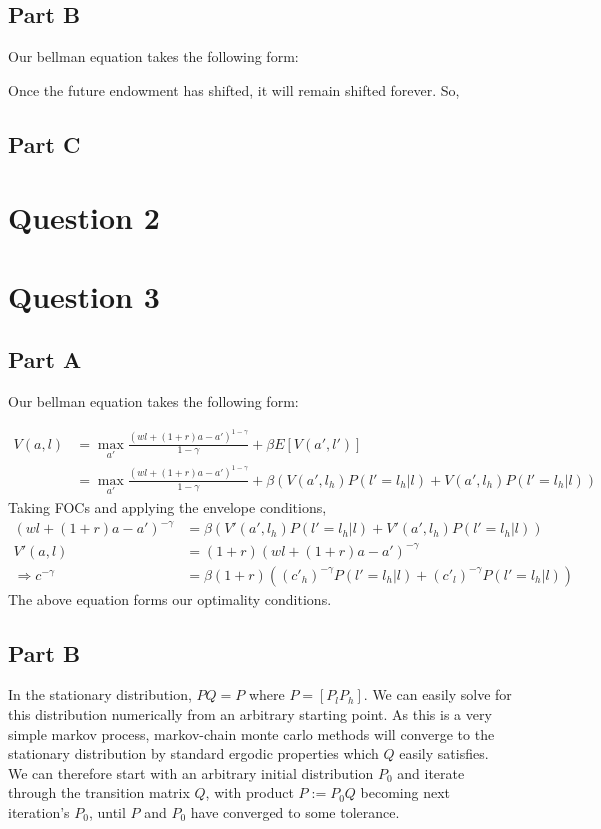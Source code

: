 \documentclass[11pt]{article} %
\begin{document}
\subsection{Part B}
Our bellman equation takes the following form:

Once the future endowment has shifted, it will remain shifted forever. So, 
\subsection{Part C}
\section{Question 2}
\section{Question 3}
\subsection{Part A}
Our bellman equation takes the following form:

\begin{align*}
V(a,l) &= \max_{a'} \frac{(wl +(1+r)a - a')^{1-\gamma}}{1-\gamma} + \beta E[V(a',l')]\\
&=  \max_{a'} \frac{(wl +(1+r)a - a')^{1-\gamma}}{1-\gamma} + \beta (V(a',l_h)P(l'=l_h|l) + V(a',l_h)P(l'=l_h|l))
\end{align*}
Taking FOCs and applying the envelope conditions,
\begin{align*}
(wl +(1+r)a - a')^{-\gamma} &= \beta(V'(a',l_h)P(l'=l_h|l) + V'(a',l_h)P(l'=l_h|l))\\
V'(a,l) &= (1+r)(wl +(1+r)a - a')^{-\gamma}\\
\Rightarrow c^{-\gamma} &= \beta(1+r)((c'_h)^{-\gamma}P(l'=l_h|l) + (c'_l)^{-\gamma}P(l'=l_h|l) )
\end{align*}
The above equation forms our optimality conditions.
\subsection{Part B}
In the stationary distribution, $PQ = P$ where $P = [P_l P_h]$. We can easily solve for this distribution numerically from an arbitrary starting point. As this is a very simple markov process, markov-chain monte carlo methods will converge to the stationary distribution by standard ergodic properties which $Q$ easily satisfies. We can therefore start with an arbitrary initial distribution $P_0$ and iterate through the transition matrix $Q$, with product $P:=P_0Q$ becoming next iteration's $P_0$, until $P$ and $P_0$ have converged to some tolerance. 
\end{document}
